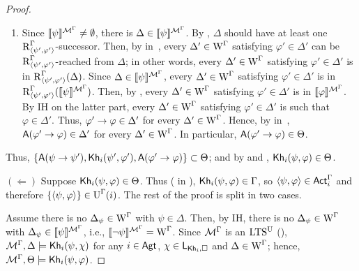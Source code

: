 \begin{proof}
\begin{enumerate}
    \item Since $\llbracket \psi \rrbracket^{\mathcal{M}^\Gamma} \neq \emptyset$, there is $\Delta \in \llbracket \psi \rrbracket^{\mathcal{M}^\Gamma}$.
    By , $\Delta$ should have at least one $\operatorname{R}^\Gamma_{\langle \psi',\varphi' \rangle}$-successor.
    Then, by  in~, every $\Delta' \in \operatorname{W}^\Gamma$ satisfying $\varphi' \in \Delta'$ can be $\operatorname{R}^\Gamma_{\langle \psi',\varphi' \rangle}$-reached from $\Delta$; in other words, every $\Delta' \in \operatorname{W}^\Gamma$ satisfying $\varphi' \in \Delta'$ is in $\operatorname{R}^\Gamma_{\langle \psi',\varphi' \rangle}(\Delta)$.
    Since $\Delta \in \llbracket \psi \rrbracket^{\mathcal{M}^\Gamma}$, every $\Delta' \in \operatorname{W}^\Gamma$ satisfying $\varphi' \in \Delta'$ is in $\operatorname{R}^\Gamma_{\langle \psi',\varphi' \rangle}(\llbracket \psi \rrbracket^{\mathcal{M}^\Gamma})$.
    Then, by , every $\Delta' \in \operatorname{W}^\Gamma$ satisfying $\varphi' \in \Delta'$ is in $\llbracket \varphi \rrbracket^{\mathcal{M}^\Gamma}$.
    By IH on the latter part, every $\Delta' \in \operatorname{W}^\Gamma$ satisfying $\varphi' \in \Delta'$ is such that $\varphi \in \Delta'$.
    Thus, $\varphi' \rightarrow \varphi \in \Delta'$ for every $\Delta' \in \operatorname{W}^\Gamma$. Hence, by  in~, ${\sf A}(\varphi' \rightarrow \varphi) \in \Delta'$ for every $\Delta' \in \operatorname{W}^\Gamma$.
    In particular, ${\sf A}(\varphi' \rightarrow \varphi) \in \Theta$.
\end{enumerate}
Thus, $\{ {\sf A}(\psi \rightarrow \psi'), {\sf Kh}_i(\psi',\varphi'), {\sf A}(\varphi' \rightarrow \varphi) \} \subset \Theta$;
and by  and , ${\sf Kh}_i(\psi, \varphi) \in \Theta$.
\smallskip

\noindent
$(\Leftarrow)$ Suppose ${\sf Kh}_i(\psi, \varphi) \in \Theta$.
Thus ( in ), ${\sf Kh}_i(\psi, \varphi) \in \Gamma$, so $\langle \psi, \varphi \rangle \in {\rm \sf Act}^\Gamma_i$ and therefore $\{ \langle \psi, \varphi \rangle \} \in \operatorname{U}^\Gamma(i)$.
The rest of the proof is split in two cases.
\smallskip

Assume there is no $\Delta_\psi \in \operatorname{W}^\Gamma$ with $\psi \in \Delta$.
Then, by IH, there is no $\Delta_\psi \in \operatorname{W}^\Gamma$ with $\Delta_\psi \in \llbracket \psi \rrbracket^{\mathcal{M}^\Gamma}$, i.e., $\llbracket \lnot\psi \rrbracket^{\mathcal{M}^\Gamma} = \operatorname{W}^\Gamma$.
Since $\mathcal{M}^\Gamma$ is an $\textup{LTS$^\text{\textup{U}}$}$ (),  $\mathcal{M}^\Gamma, \Delta \models {\sf Kh}_i(\psi, \chi)$ for any $i \in {\rm \sf Agt}$, $\chi \in \mathsf{L}_{{\sf Kh}_i,\square}$ and $\Delta \in \operatorname{W}^\Gamma$; hence, $\mathcal{M}^\Gamma, \Theta \models {\sf Kh}_i(\psi, \varphi)$.
\smallskip


\end{proof}
